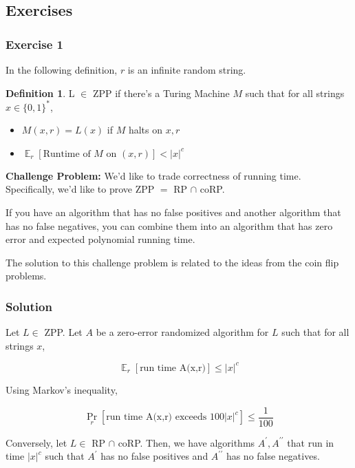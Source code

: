 \documentclass{article}
\theoremstyle{definition}
\newtheorem{definition}{Definition}
\newcommand{\xtoc}{\lvert x \rvert ^{c}}
\newcommand{\dprime}{\prime\prime}
\DeclareMathOperator*{\E}{\mathbb{E}}
\begin{document}
\subsection{Exercises}

\subsubsection{Exercise 1}

In the following definition, $r$ is an infinite random string.

\begin{definition}
    L $\in$ ZPP if there's a Turing Machine $M$ such that for all strings $x \in \{0,1\}^{*}$,

    \begin{itemize}
        \item $M(x,r) = L(x)$ if $M$ halts on $x,r$
        \item $\E_{r}[\text{Runtime of $M$ on $(x,r)$}] < \xtoc$
    \end{itemize}
\end{definition}

\textbf{Challenge Problem:} We'd like to trade correctness of running time. Specifically, we'd like to prove ZPP $=$ RP $\cap$ coRP.

If you have an algorithm that has no false positives and another algorithm that has no false negatives, you can combine them into an algorithm that has zero error and expected polynomial running time.

The solution to this challenge problem is related to the ideas from the coin flip problems.

\subsubsection{Solution}

Let $L \in$ ZPP. Let $A$ be a zero-error randomized algorithm
for $L$ such that for all strings $x$, 

\[ \E_{r}[\text{run time A(x,r)}] \leq \xtoc\]

Using Markov's inequality,

\[ \Pr_{r}[\text{run time A(x,r) exceeds $100 \xtoc$}] \leq \frac{1}{100}\]

Conversely, let $L \in$ RP $\cap$ coRP.
Then, we have algorithms $A^{\prime}, A^{\prime\prime}$ that run
in time $\xtoc$ such that $A^{\prime}$ has no false positives and
$A^{\dprime}$ has no false negatives.
\end{document}
